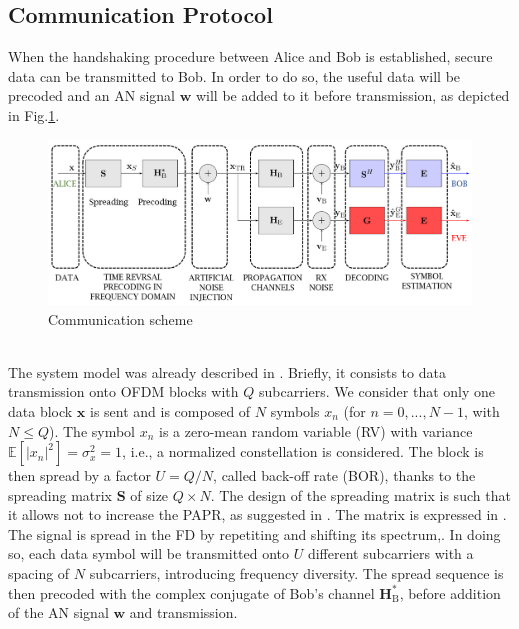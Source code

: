 \documentclass[journal,comsoc]{IEEEtran}
\let\MYoriglatexcaption\caption
\renewcommand{\caption}[2][\relax]{\MYoriglatexcaption[#2]{#2}}
\newcommand{\EX}[1]{\mathbb{E} \left[#1\right]}%
\newcommand{\HB}{\textbf{H}_{\text{B}}}
\newcommand{\spread}{\textbf{S}}
\newcommand{\w}{\textbf{w}}
\begin{document}
\subsection{Communication Protocol}
When the handshaking procedure between Alice and Bob is established, secure data can be transmitted to Bob. In order to do so, the useful data will be precoded and an AN signal $\w$ will be added to it before transmission, as depicted in Fig.\ref{fig_com_scheme}.  
\begin{figure}[h!t]
	\centering
	\includegraphics[width=1\linewidth]{graphs/com_scheme_an.PNG}
	\caption{Communication scheme}
	\label{fig_com_scheme}
\end{figure}\\
The system model was already described in \cite{9049811}. Briefly, it consists to data transmission onto OFDM blocks with $Q$ subcarriers. We consider that only one data block $\textbf{x}$ is sent and is composed of $N$ symbols $x_n$ (for $n = 0,..., N-1$, with $N\leq Q$). The symbol $x_n$ is  a zero-mean random variable (RV) with variance $\EX{|x_n|^2} = \sigma_x^2 = 1$, i.e., a normalized constellation is considered. The block is then spread by a factor $U = Q/N$, called back-off rate (BOR), thanks to the spreading matrix $\spread$ of size $Q\times N$. The design of the spreading matrix is such that it allows not to increase the PAPR, as suggested in \cite{4394231}. The matrix is expressed in \cite{9049811}. The signal is spread in the FD by repetiting and shifting its spectrum,\cite{8883213}. In doing so, each data symbol will be transmitted onto $U$ different subcarriers with a spacing of $N$ subcarriers, introducing frequency diversity. The spread sequence is then precoded with the complex conjugate of Bob's channel $\HB^*$, before addition of the AN signal $\textbf{w}$  and transmission. 
\end{document}
